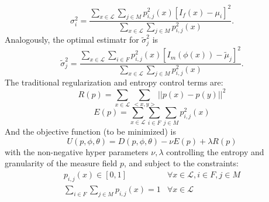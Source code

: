 \documentclass[11pt]{article}
\begin{document}
\begin{equation}
	\sigma_{i}^{2} = \frac{\sum_{x\in\mathcal{L}}\sum_{j\in M} p_{i,j}^{2}(x)[I_{f}(x) - \mu_i]^{2}}{\sum_{x\in\mathcal{L}}\sum_{j\in M} p_{i,j}^{2}(x)}.
\end{equation}
Analogously, the optimal estimatr for $\tilde{\sigma}^{2}_j$ is
\begin{equation}
	\tilde{\sigma}_{j}^{2} = \frac{\sum_{x\in\mathcal{L}}\sum_{i\in F} p_{i,j}^{2}(x)[I_{m}(\phi(x)) - \tilde{\mu}_j]^{2}}{\sum_{x\in\mathcal{L}}\sum_{j\in M} p_{i,j}^{2}(x)}.
\end{equation}
The traditional regularization and entropy control terms are:
\begin{equation}
	R(p) = \sum_{x\in\mathcal{L}}\sum_{<x,y>}\left||p(x)-p(y)\right||^{2}
\end{equation}
\begin{equation}
	E(p) = \sum_{x\in\mathcal{L}}\sum_{i\in F}\sum_{j\in M} p_{i,j}^{2}(x)
\end{equation}
And the objective function (to be minimized) is
\begin{equation}
	U(p,\phi, \theta) = D(p, \phi, \theta) - \nu E(p) + \lambda R(p)
\end{equation}
with the non-negative hyper parameters $\nu, \lambda$ controlling the entropy and granularity of the measure field $p$, and subject to the constraints:\\
\begin{equation}
	\begin{array}{ll}
		p_{i,j}(x)\in [0,1] & \forall x\in \mathcal{L}, i\in{F}, j\in M\\
		\sum_{i\in F}\sum_{j\in M}p_{i,j}(x)=1 & \forall x\in \mathcal{L}
	\end{array}
\end{equation}
\end{document}
